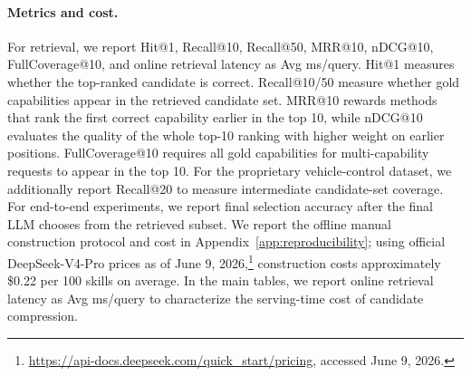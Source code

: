 \documentclass[11pt]{article}
\begin{document}
\paragraph{Metrics and cost.}
For retrieval, we report Hit@1, Recall@10, Recall@50, MRR@10, nDCG@10, FullCoverage@10, and online retrieval latency as Avg ms/query. Hit@1 measures whether the top-ranked candidate is correct. Recall@10/50 measure whether gold capabilities appear in the retrieved candidate set. MRR@10 rewards methods that rank the first correct capability earlier in the top 10, while nDCG@10 evaluates the quality of the whole top-10 ranking with higher weight on earlier positions. FullCoverage@10 requires all gold capabilities for multi-capability requests to appear in the top 10. For the proprietary vehicle-control dataset, we additionally report Recall@20 to measure intermediate candidate-set coverage. For end-to-end experiments, we report final selection accuracy after the final LLM chooses from the retrieved subset. We report the offline manual construction protocol and cost in Appendix~\ref{app:reproducibility}; using official DeepSeek-V4-Pro prices as of June 9, 2026,\footnote{\url{https://api-docs.deepseek.com/quick_start/pricing}, accessed June 9, 2026.} construction costs approximately \$0.22 per 100 skills on average. In the main tables, we report online retrieval latency as Avg ms/query to characterize the serving-time cost of candidate compression.


\begin{table}[t]
\centering
\small
{}
\caption{BFCL-V4 live multiple retrieval over the complete 457-tool pool.}
\label{tab:atomic-tool-results}
\end{table}
\end{document}
